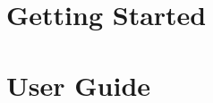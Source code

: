 



\maketitle
\tableofcontents

\chapter{Getting Started}

\chapter{User Guide}
\label{chap:user-guide}




